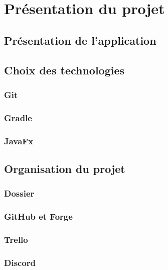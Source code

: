 \chapter{Présentation du projet}

	\section{Présentation de l'application}



	\section{Choix des technologies}

		\subsection{Git}



		\subsection{Gradle}



		\subsection{JavaFx}



	\section{Organisation du projet}



		\subsection{Dossier}



		\subsection{GitHub et Forge}



		\subsection{Trello}



		\subsection{Discord}
